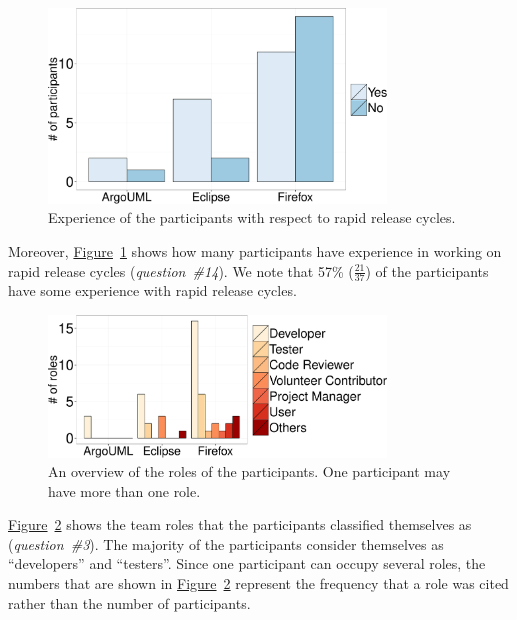 \begin{figure}
	\centering
	\includegraphics[width=0.80\textwidth,keepaspectratio] 
	{chapters/chapter5/figures/demographic_rapid_releases.pdf}
	\caption{Experience of the participants with respect to rapid release
	cycles.}
	\label{fig:demographics_rapid_releases}
\end{figure}
Moreover,
\hyperref[fig:demographics_rapid_releases]{Figure}~\ref{fig:demographics_rapid_releases}
shows how many participants have experience in working on rapid release cycles
({\em question~\#14}). We note that 57\% ($\frac{21}{37}$) of the participants
have some experience with rapid release cycles.
\begin{figure}
	\centering
	\includegraphics[width=0.80\textwidth,keepaspectratio] 
	{chapters/chapter5/figures/roles_demographics.pdf}
	\caption{An overview of the roles of the participants. One participant
	may have more than one role.}
	\label{fig:roles_demographics}
\end{figure}
\hyperref[fig:roles_demographics]{Figure}~\ref{fig:roles_demographics} shows the
team roles that the participants classified themselves as ({\em question~\#3}).
The majority of the participants consider themselves as ``developers'' and
``testers''. Since one participant can occupy several roles, the numbers that
are shown in
\hyperref[fig:roles_demographics]{Figure}~\ref{fig:roles_demographics} represent
the frequency that a role was cited rather than the number of participants.
